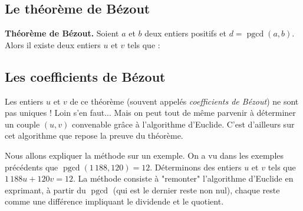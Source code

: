 \documentclass[11pt,class=report,crop=false]{standalone}
\newcommand{\pgcd}{\mathop{\mathrm{pgcd}}\nolimits}
\begin{document}






\bigskip

\subsection*{Le théorème de Bézout}



\textbf{Théorème de Bézout.}
Soient $a$ et $b$ deux entiers positifs et $d=\pgcd(a,b)$. Alors il existe deux entiers $u$ et $v$ tels que :
    
    
\subsection*{Les coefficients de Bézout}

Les entiers $u$ et $v$ de ce théorème (souvent appelés \emph{coefficients de Bézout}) ne sont pas uniques ! Loin s'en faut... Mais on peut tout de même parvenir à déterminer un couple $(u,v)$ convenable grâce à l'algorithme d'Euclide. C'est d'ailleurs sur cet algorithme que repose la preuve du théorème.


Nous allons expliquer la méthode sur un exemple. On a vu dans les exemples précédents que $\pgcd(1\,188,120)=12$.
Déterminons des entiers $u$ et $v$ tels que $1\,188 u + 120v = 12$.
La méthode consiste à "remonter" l'algorithme d'Euclide en exprimant, à partir du $\pgcd$ (qui est le dernier reste non nul), chaque reste comme une différence impliquant le dividende et le quotient.
    
\end{document}
